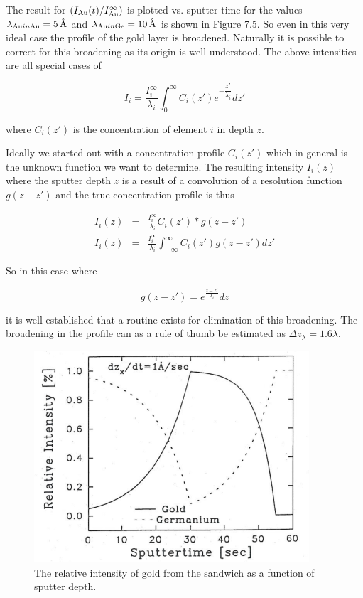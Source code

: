 The result for $(I_{\ce{Au}}(t)/I_{\ce{Au}}^{\infty})$ is plotted vs. sputter time for the values $\lambda_{\ce{Au} in \ce{Au}}=\SI{5}{\angstrom}$ and $\lambda_{\ce{Au} in \ce{Ge}}=\SI{10}{\angstrom}$ is shown in Figure 7.5. So even in this very ideal case the profile of the gold layer is broadened. Naturally it is possible to correct for this broadening as its origin is well understood. The above intensities are all special cases of

\begin{equation}
I_i=\frac{I^{\infty}_i}{\lambda_i}\int^{\infty}_0C_i(z\prime)e^{-\dfrac{z\prime}{\lambda_i}}dz\prime
\end{equation}

\noindent where $C_i(z\prime)$ is the concentration of element $i$ in depth $z$.

Ideally we started out with a concentration profile $C_i(z\prime)$ which in general is the unknown function we want to determine. The resulting intensity $I_i(z)$ where the sputter depth $z$ is a result of a convolution of a resolution function $g(z-z\prime)$ and the true concentration profile is thus

\begin{eqnarray}
I_i(z)	& =	& \frac{I^{\infty}_i}{\lambda_i}C_i(z\prime)*g(z-z')\\
I_i(z)	& =	& \frac{I^{\infty}_i}{\lambda_i} \int^{\infty}_{-\infty}C_i(z\prime)g(z-z\prime)dz\prime
\end{eqnarray}

So in this case where

\begin{equation}
g(z-z\prime)=e^{\frac{z-z\prime}{\lambda_i}}dz
\end{equation}

\noindent it is well established that a routine exists for elimination of this broadening. The broadening in the profile can as a rule of thumb be estimated as $\Delta z_{\lambda}=1.6\lambda$.

\begin{figure}[h!]
	\begin{center}
	\includegraphics[scale=3.5]{figures/07_05.png}
	\caption{The relative intensity of gold from the sandwich as a function of sputter depth.}
	\label{fig:auint}
	\end{center}
\end{figure}

